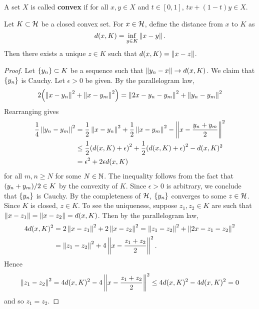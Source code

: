 \begin{definition}
    A set $X$ is called \textbf{convex} if for all $x,y\in X$ and $t\in[0,1]$, 
    $tx + (1-t)y\in X$.
\end{definition}

\begin{theorem}\label{thm:hilbert_proj}
    Let $K\subset\mathcal{H}$ be a closed convex set. For $x\in\mathcal{H}$, define the distance 
    from $x$ to $K$ as
    \begin{equation*}
        d(x,K) = \inf_{y\in K}\left\lVert {x-y} \right\rVert.
    \end{equation*}
    Then there exists a unique $z\in K$ such that $d(x,K) = \left\lVert {x-z} \right\rVert$.
\end{theorem}
\begin{proof}
    Let $\left\{ {y_n} \right\}\subset K$ be a sequence such that $\left\lVert {y_n-x} \right\rVert\to d(x,K)$. 
    We claim that $\left\{ {y_n} \right\}$ is Cauchy. Let $\epsilon>0$ be given. By the 
    parallelogram law, 
    \begin{equation*}
        2\pth{\norm{x-y_n}^2 + \norm{x-y_m}^2} = \norm{2x-y_n-y_m}^2 + \norm{y_n-y_m}^2
    \end{equation*}
    Rearranging gives 
    \begin{equation*}
        \begin{split}
            \frac{1}{4}\norm{y_n-y_m}^2 
            &= \frac{1}{2}\norm{x-y_n}^2 + \frac{1}{2}\norm{x-y_m}^2 - \norm{x-\frac{y_n+y_m}{2}}^2 \\
            &\leq \frac{1}{2}\pth{d(x,K)+\epsilon}^2 + \frac{1}{2}\pth{d(x,K)+\epsilon}^2 - d(x,K)^2 \\ 
            &= \epsilon^2 + 2\epsilon d(x,K)
        \end{split}
    \end{equation*}
    for all $m,n\geq N$ for some $N\in\mathbb{N}$. The inequality follows from the fact 
    that $\pth{y_n+y_m}/2\in K$ by the convexity of $K$. Since $\epsilon>0$ is 
    arbitrary, we conclude that $\left\{ {y_n} \right\}$ is Cauchy. By the completeness of 
    $\mathcal{H}$, $\left\{ {y_n} \right\}$ converges to some $z\in\mathcal{H}$. Since $K$ is closed, 
    $z\in K$. To see the uniqueness, suppose $z_1,z_2\in K$ are such that 
    $\left\lVert {x-z_1} \right\rVert = \left\lVert {x-z_2} \right\rVert = d(x,K)$. Then by the parallelogram law, 
    \begin{equation*}
        \begin{split}
            4d(x,K)^2 &= 2\left\lVert {x-z_1} \right\rVert^2 + 2\left\lVert {x-z_2} \right\rVert^2 
            = \left\lVert {z_1-z_2} \right\rVert^2 + \left\lVert {2x-z_1-z_2} \right\rVert^2 \\
            &= \left\lVert {z_1-z_2} \right\rVert^2 + 4\left\lVert {x-\frac{z_1+z_2}{2}} \right\rVert^2. 
        \end{split}
    \end{equation*}
    Hence 
    \begin{equation*}
        \left\lVert {z_1-z_2} \right\rVert^2 = 4d(x,K)^2 - 4\left\lVert {x-\frac{z_1+z_2}{2}} \right\rVert^2 
        \leq 4d(x,K)^2 - 4d(x,K)^2 = 0
    \end{equation*}
    and so $z_1 = z_2$.
\end{proof}

